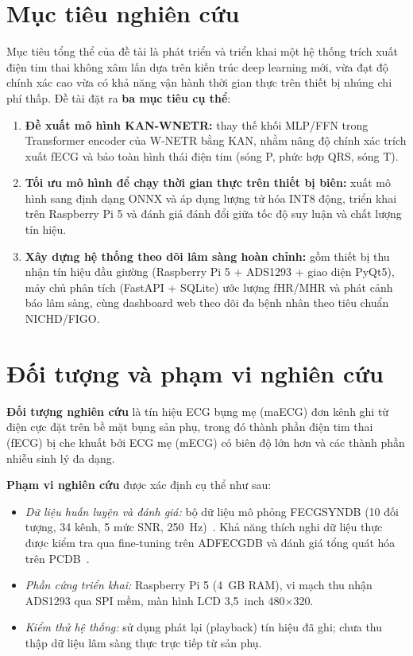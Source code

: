 \documentclass[../DoAn.tex]{subfiles}
\begin{document}
\section{Mục tiêu nghiên cứu}
\label{section:1.3}

Mục tiêu tổng thể của đề tài là phát triển và triển khai một hệ thống trích xuất điện tim thai không xâm lấn dựa trên kiến trúc deep learning mới, vừa đạt độ chính xác cao vừa có khả năng vận hành thời gian thực trên thiết bị nhúng chi phí thấp. Đề tài đặt ra \textbf{ba mục tiêu cụ thể}:

\begin{enumerate}
  \item \textbf{Đề xuất mô hình KAN-WNETR:} thay thế khối MLP/FFN trong Transformer encoder của W-NETR bằng KAN, nhằm nâng độ chính xác trích xuất fECG và bảo toàn hình thái điện tim (sóng P, phức hợp QRS, sóng T).
  \item \textbf{Tối ưu mô hình để chạy thời gian thực trên thiết bị biên:} xuất mô hình sang định dạng ONNX và áp dụng lượng tử hóa INT8 động, triển khai trên Raspberry Pi 5 và đánh giá đánh đổi giữa tốc độ suy luận và chất lượng tín hiệu.
  \item \textbf{Xây dựng hệ thống theo dõi lâm sàng hoàn chỉnh:} gồm thiết bị thu nhận tín hiệu đầu giường (Raspberry Pi 5 + ADS1293 + giao diện PyQt5), máy chủ phân tích (FastAPI + SQLite) ước lượng fHR/MHR và phát cảnh báo lâm sàng, cùng dashboard web theo dõi đa bệnh nhân theo tiêu chuẩn NICHD/FIGO.
\end{enumerate}

\section{Đối tượng và phạm vi nghiên cứu}
\label{section:1.4}

\textbf{Đối tượng nghiên cứu} là tín hiệu ECG bụng mẹ (maECG) đơn kênh ghi từ điện cực đặt trên bề mặt bụng sản phụ, trong đó thành phần điện tim thai (fECG) bị che khuất bởi ECG mẹ (mECG) có biên độ lớn hơn và các thành phần nhiễu sinh lý đa dạng.

\textbf{Phạm vi nghiên cứu} được xác định cụ thể như sau:
\begin{itemize}
  \item \textit{Dữ liệu huấn luyện và đánh giá:} bộ dữ liệu mô phỏng FECGSYNDB (10 đối tượng, 34 kênh, 5 mức SNR, 250~Hz)~\cite{andreottiOpensourceFrameworkStresstesting2016}. Khả năng thích nghi dữ liệu thực được kiểm tra qua fine-tuning trên ADFECGDB và đánh giá tổng quát hóa trên PCDB~\cite{beharNoninvasiveFECGExtraction2013}.
  \item \textit{Phần cứng triển khai:} Raspberry Pi 5 (4~GB RAM), vi mạch thu nhận ADS1293 qua SPI mềm, màn hình LCD 3,5~inch 480$\times$320.
  \item \textit{Kiểm thử hệ thống:} sử dụng phát lại (playback) tín hiệu đã ghi; chưa thu thập dữ liệu lâm sàng thực trực tiếp từ sản phụ.
\end{itemize}
\end{document}
